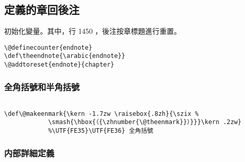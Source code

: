 \subsection{定義的章回後注}

\par 初始化變量。其中，行 1450 ，後注按章標題進行重置。
\begin{lstlisting}[firstnumber=1448]
\@definecounter{endnote}
\def\theendnote{\arabic{endnote}}
\@addtoreset{endnote}{chapter}
\end{lstlisting}



\subsubsection{全角括號和半角括號}

\begin{lstlisting}[firstnumber=1452]
%\def\@makeenmark{\kern -1.2zw \raisebox{.8zh}{\tiny （{\hbox{\yoko\expandafter\ajTsumesuji\expandafter*\expandafter{\number\@theenmark}}}）}}

\def\@makeenmark{\kern -1.7zw \raisebox{.8zh}{\szix %
            \smash{\hbox{（{\zhnumber{\@theenmark}}）}}}\kern .2zw}
            %\UTF{FE35}\UTF{FE36} 全角括號
\end{lstlisting}



\subsubsection{内部詳細定義}

